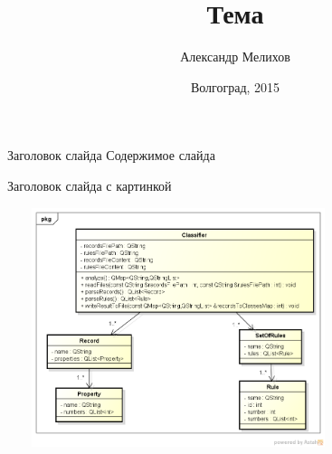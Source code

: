 \documentclass{beamer}
\begin{document}
\title{Тема}
\author{Александр Мелихов}
\date{Волгоград, 2015}

\frame{\titlepage}

\begin{frame}{Заголовок слайда}
    Содержимое слайда
\end{frame}

\begin{frame}{Заголовок слайда с картинкой}
    \begin{center}
        \includegraphics[width=100mm,height=70mm]{class_diagram}
    \end{center}
\end{frame}
\end{document}
